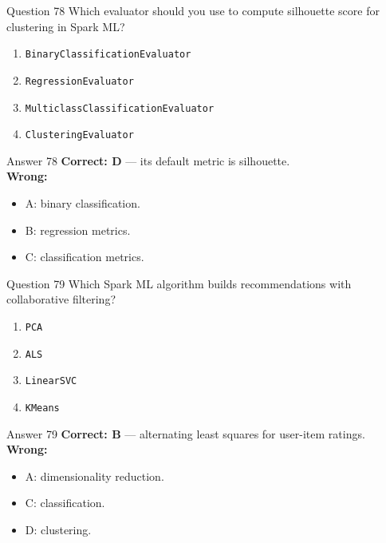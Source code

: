 \documentclass[aspectratio=169,11pt]{beamer}
\begin{document}
\begin{frame}{Question 78}
Which evaluator should you use to compute silhouette score for clustering in Spark ML?
\begin{enumerate}[label=\Alph*.]
\item \texttt{BinaryClassificationEvaluator}
\item \texttt{RegressionEvaluator}
\item \texttt{MulticlassClassificationEvaluator}
\item \texttt{ClusteringEvaluator}
\end{enumerate}
\end{frame}
\begin{frame}{Answer 78}
\textbf{Correct: D} --- its default metric is silhouette.\\
\vspace{0.5em}
\textbf{Wrong:}
\begin{itemize}
\item A: binary classification.
\item B: regression metrics.
\item C: classification metrics.
\end{itemize}
\end{frame}

\begin{frame}{Question 79}
Which Spark ML algorithm builds recommendations with collaborative filtering?
\begin{enumerate}[label=\Alph*.]
\item \texttt{PCA}
\item \texttt{ALS}
\item \texttt{LinearSVC}
\item \texttt{KMeans}
\end{enumerate}
\end{frame}
\begin{frame}{Answer 79}
\textbf{Correct: B} --- alternating least squares for user-item ratings.\\
\vspace{0.5em}
\textbf{Wrong:}
\begin{itemize}
\item A: dimensionality reduction.
\item C: classification.
\item D: clustering.
\end{itemize}
\end{frame}
\end{document}
